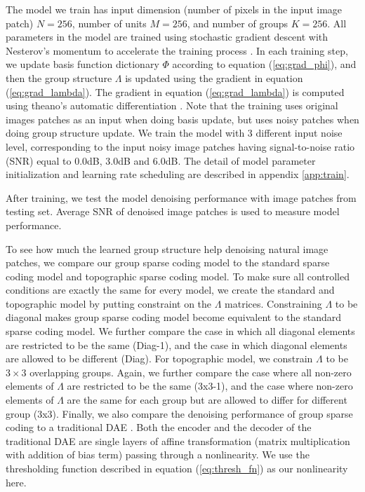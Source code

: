 The model we train has input dimension (number of pixels in the input image patch) $N = 256$, number of units $M = 256$, and number of groups $K = 256$. All parameters in the model are trained using stochastic gradient descent with Nesterov's momentum to accelerate the training process \cite{si13}. In each training step, we update basis function dictionary $\Phi$ according to equation (\ref{eq:grad_phi}), and then the group structure $\Lambda$ is updated using the gradient in equation (\ref{eq:grad_lambda}). The gradient in equation (\ref{eq:grad_lambda}) is computed using theano's automatic differentiation \cite{bj10, bf12}. Note that the training uses original images patches as an input when doing basis update, but uses noisy patches when doing group structure update. We train the model with 3 different input noise level, corresponding to the input noisy image patches having signal-to-noise ratio (SNR) equal to 0.0dB, 3.0dB and 6.0dB. The detail of model parameter initialization and learning rate scheduling are described in appendix \ref{app:train}.

After training, we test the model denoising performance with image patches from testing set. Average SNR of denoised image patches is used to measure model performance.

To see how much the learned group structure help denoising natural image patches, we compare our group sparse coding model to the standard sparse coding model and topographic sparse coding model. To make sure all controlled conditions are exactly the same for every model, we create the standard and topographic model by putting constraint on the $\Lambda$ matrices. Constraining $\Lambda$ to be diagonal makes group sparse coding model become equivalent to the standard sparse coding model. We further compare the case in which all diagonal elements are restricted to be the same (Diag-1), and the case in which diagonal elements are allowed to be different (Diag). For topographic model, we constrain $\Lambda$ to be $3\times 3$ overlapping groups. Again, we further compare the case where all non-zero elements of $\Lambda$ are restricted to be the same (3x3-1), and the case where non-zero elements of $\Lambda$ are the same for each group but are allowed to differ for different group (3x3). Finally, we also compare the denoising performance of group sparse coding to a traditional DAE \cite{vp10}. Both the encoder and the decoder of the traditional DAE are single layers of affine transformation (matrix multiplication with addition of bias term) passing through a nonlinearity. We use the thresholding function described in equation (\ref{eq:thresh_fn}) as our nonlinearity here.

